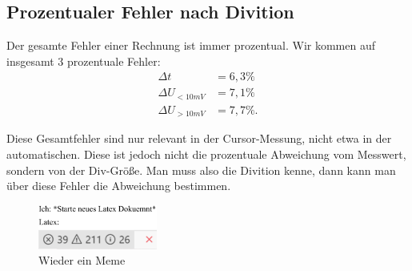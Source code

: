 \subsection*{Prozentualer Fehler nach Divition}
Der gesamte Fehler einer Rechnung ist immer prozentual. Wir kommen auf insgesamt 3 prozentuale Fehler:
\begin{align}
\Delta t &= 6,3\%\\
\Delta U_{<10mV} &= 7,1\% \\
\Delta U_{>10mV} &= 7,7\%.
\end{align}

Diese Gesamtfehler sind nur relevant in der Cursor-Messung, nicht etwa in der automatischen.
Diese ist jedoch nicht die prozentuale Abweichung vom Messwert, sondern von der Div-Größe. Man muss also die Divition kenne, dann kann man über diese Fehler die Abweichung bestimmen.

\begin{figure}[h!]
    \centering
    \includegraphics[width=0.35\textwidth]{img/25/memes/latexErrors.pdf}
    \caption{Wieder ein Meme}
\end{figure}

\newpage


